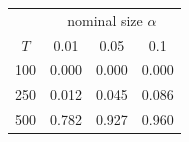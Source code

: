 % 
\begin{tabular}{cccc}
  \hline
  & \multicolumn{3}{c}{nominal size $\alpha$} \\
 $T$ & 0.01 & 0.05 & 0.1 \\
 \hline
100 & 0.000 & 0.000 & 0.000 \\ 
  250 & 0.012 & 0.045 & 0.086 \\ 
  500 & 0.782 & 0.927 & 0.960 \\ 
   \hline
\end{tabular}
